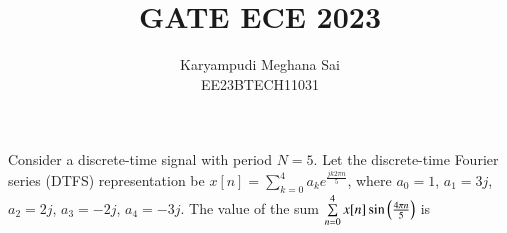 \documentclass[journal,12pt,onecolumn]{IEEEtran}
\theoremstyle{remark}
\begin{document}
\let\vec\mathbf







\bigskip



\title{GATE ECE 2023}
\author{Karyampudi Meghana Sai\\ EE23BTECH11031}
\maketitle
Consider a discrete-time signal with period $N=5$. Let the discrete-time Fourier series (DTFS) representation be $x[n]=\sum\limits_{k=0}^{4} a_k e^{\frac{jk2\pi n}{5}}$, where $a_0=1$, $a_1=3j$, $a_2=2j$, $a_3=-2j$, $a_4=-3j$. The value of the sum $\sum\limits_{n=0}^{4}x[n] \sin\left(\frac{4\pi n}{5}\right)$ is\\
\end{document}
